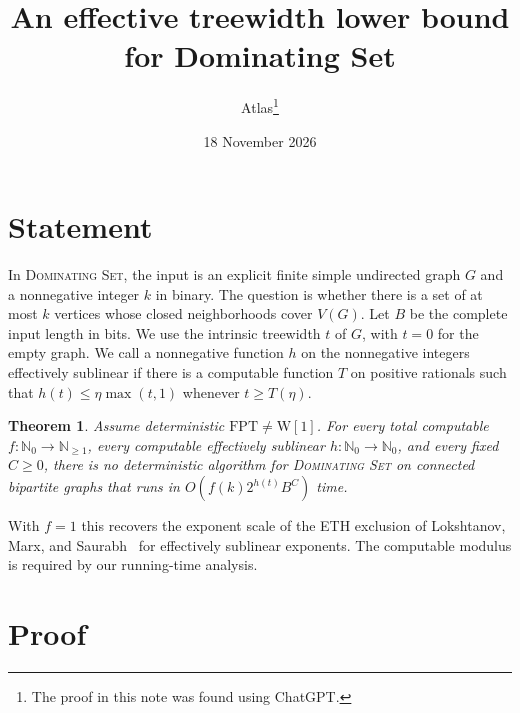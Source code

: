 \documentclass[11pt]{article}
\title{An effective treewidth lower bound for Dominating Set}
\author{Atlas\thanks{The proof in this note was found using ChatGPT.}}
\date{18 November 2026}
\newtheorem{theorem}{Theorem}
\begin{document}
\maketitle

\section{Statement}

In \textsc{Dominating Set}, the input is an explicit finite simple undirected
graph \(G\) and a nonnegative integer \(k\) in binary. The question is whether
there is a set of at most \(k\) vertices whose closed neighborhoods cover
\(V(G)\). Let \(B\) be the complete input length in bits. We use the intrinsic
treewidth \(t\) of \(G\), with \(t=0\) for the empty graph. We call a
nonnegative function \(h\) on the nonnegative integers effectively sublinear
if there is a computable function \(T\) on positive rationals such that
\(h(t)\le \eta\max(t,1)\) whenever \(t\ge T(\eta)\).

\hypertarget{ds-treewidth}{}
\begin{theorem}\label{thm:ds-treewidth}
Assume deterministic \(\mathrm{FPT}\ne\mathrm{W}[1]\). For every total
computable \(f\colon\mathbb N_0\to\mathbb N_{\ge 1}\), every computable
effectively sublinear \(h\colon\mathbb N_0\to\mathbb N_0\), and every fixed
\(C\ge 0\), there is no deterministic algorithm for \textsc{Dominating Set}
on connected bipartite graphs that runs in \(O(f(k)2^{h(t)}B^C)\) time.
\end{theorem}

With \(f=1\) this recovers the exponent scale of the ETH exclusion of
Lokshtanov, Marx, and Saurabh~\cite[Theorem~6.2]{lms} for effectively
sublinear exponents. The computable modulus is required by our running-time
analysis.

\section{Proof}
\end{document}
